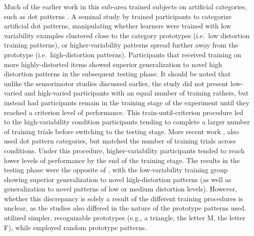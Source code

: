 \documentclass[
  12pt,
  letterpaper,
]{article}
\begin{document}
Much of the earlier work in this sub-area trained subjects on artificial
categories, such as dot patterns
\autocite{homaCategoryBreadthAbstraction1976,posnerGenesisAbstractIdeas1968}.
A seminal study by \textcite{posnerGenesisAbstractIdeas1968} trained
participants to categorize artificial dot patterns, manipulating whether
learners were trained with low variability examples clustered close to
the category prototypes (i.e.~low distortion training patterns), or
higher-variability patterns spread further away from the prototype
(i.e.~high-distortion patterns). Participants that received training on
more highly-distorted items showed superior generalization to novel high
distortion patterns in the subsequent testing phase. It should be noted
that unlike the sensorimotor studies discussed earlier, the
\textcite{posnerGenesisAbstractIdeas1968} study did not present
low-varied and high-varied participants with an equal number of training
rathers, but instead had participants remain in the training stage of
the experiment until they reached a criterion level of performance. This
train-until-criterion procedure led to the high-variability condition
participants tending to complete a larger number of training trials
before switching to the testing stage. More recent work
\autocite{huHighvariabilityTrainingDoes2024}, also used dot pattern
categories, but matched the number of training trials across conditions.
Under this procedure, higher-variability participants tended to reach
lower levels of performance by the end of the training stage. The
results in the testing phase were the opposite of
\textcite{posnerGenesisAbstractIdeas1968}, with the low-variability
training group showing superior generalization to novel high-distortion
patterns (as well as generalization to novel patterns of low or medium
distortion levels). However, whether this discrepancy is solely a result
of the different training procedures is unclear, as the studies also
differed in the nature of the prototype patterns used.
\textcite{posnerGenesisAbstractIdeas1968} utilized simpler, recognizable
prototypes (e.g., a triangle, the letter M, the letter F), while
\textcite{huHighvariabilityTrainingDoes2024} employed random prototype
patterns.
\end{document}
